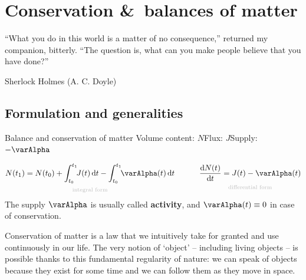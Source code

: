 \documentclass[a4paper,12pt,%
onecolumn,oneside,titlepage,%
british%
]{memoir}
\newcommand*{\amp}{\&}
\newcommand*{\di}{\mathrm{d}}%
\renewcommand*{\|}[1][]{\nonscript\:#1\vert\nonscript\:\mathopen{}}
\newcommand*{\yti}{t_{0}}
\newcommand*{\ytf}{t_{1}}
\newcommand*{\yN}{N}
\newcommand*{\yJ}{J}
\newcommand*{\ya}{\varAlpha}
\begin{document}
\printpagenotes*
\clearpage
\chapter{Conservation \amp\ balances of matter}
\label{cha:cons_matter}

\epigraph{\enquote{What you do in this world is a matter of no consequence,} returned my companion, bitterly. \enquote{The question is, what can you make people believe that you have done?\textellipsis}}{Sherlock Holmes (A. C. Doyle) \cites*{doyle1887}}

\section{Formulation and generalities}
\label{sec:cons_matter_formulation}

\begin{definition}{Balance and conservation of matter}
  Volume content: $\yN$\qquad Flux: $\yJ$\qquad Supply: $-\ya$

  \begin{equation}
    \label{eq:cons_matter}
      \underbracket[0pt]{\yN(\ytf) =\yN(\yti) + \int_{\yti}^{\ytf}\!\!\yJ(t)\,\di t  -\int_{\yti}^{\ytf}\!\!\ya(t)\,\di t}_{\mathclap{\text{\color{grey}integral form}}}
      \qquad\quad
      \underbracket[0pt]{\frac{\di\yN(t)}{\di t} = \yJ(t)  -\ya(t)}_{\mathclap{\text{\color{grey}differential form}}}
  \end{equation}
  The supply $\ya$ is usually called \textbf{activity}, and $\ya(t)\equiv 0$ in case of conservation.
\end{definition}

Conservation of matter is a law that we intuitively take for granted and use continuously in our life. The very notion of \enquote*{object} -- including living objects -- is possible thanks to this fundamental regularity of nature: we can speak of objects because they exist for some time and we can follow them as they move in space. %
\end{document}
